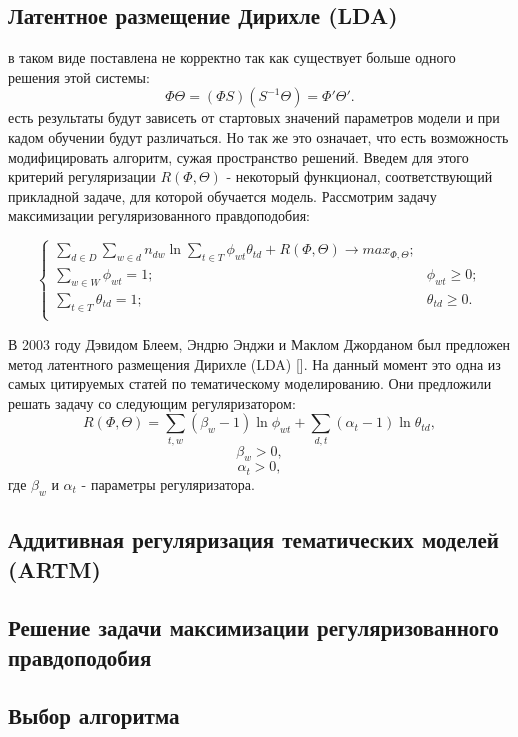 \subsection{Латентное размещение Дирихле (LDA)}

 в таком виде поставлена не корректно так как существует больше одного решения этой системы:
$$
\Phi\Theta = (\Phi S)(S^{-1}\Theta)=\Phi'\Theta'.
$$
 есть результаты будут зависеть от стартовых значений параметров модели и при кадом обучении будут различаться. Но так же это означает, что есть возможность модифицировать алгоритм, сужая пространство решений. Введем для этого критерий регуляризации $R(\Phi,\Theta)$ - некоторый функционал, соответствующий прикладной задаче, для которой обучается модель. Рассмотрим задачу максимизации регуляризованного правдоподобия:

$$ 
\begin{cases}
    \sum_{d \in D} \sum_{w \in d} n_{dw} \ln{\sum_{t \in T} \phi_{wt} \theta_{td} } + R(\Phi,\Theta) \rightarrow max_{\Phi,\Theta};\\
    \sum_{w \in W}\phi_{wt} = 1; &\phi_{wt} \ge 0;\\
    \sum_{t \in T}\theta_{td} = 1; &\theta_{td} \ge 0.\\
\end{cases}
$$

В 2003 году Дэвидом Блеем, Эндрю Энджи и Маклом Джорданом был предложен метод латентного размещения Дирихле (LDA) [\todo{}]. На данный момент это одна из самых цитируемых статей по тематическому моделированию. Они предложили решать задачу со следующим регуляризатором:
$$
R(\Phi,\Theta) = \sum_{t,w}{(\beta_w-1)\ln{\phi_{wt}}} + \sum_{d,t}{(\alpha_t-1)\ln{\theta_{td}}},
$$
$$
\beta_w > 0, 
$$
$$
\alpha_t > 0,
$$
где $\beta_w$ и $\alpha_t$ - параметры регуляризатора.








\subsection{Аддитивная регуляризация тематических моделей (ARTM)}

\subsection{Решение задачи максимизации регуляризованного правдоподобия}

\subsection{Выбор алгоритма}

